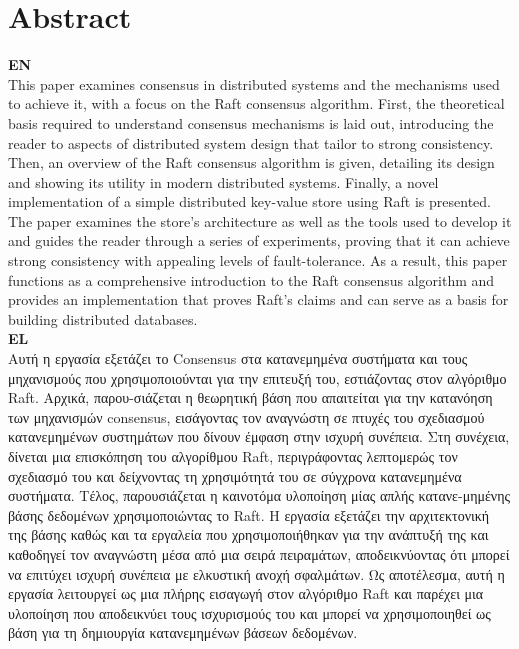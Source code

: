 \setlength{\parskip}{0pt}

\clearpage
\chapter*{Abstract}

\textbf{EN}\\

This paper examines consensus in distributed systems and the mechanisms used to achieve it, with a focus on the Raft consensus algorithm. First, the theoretical basis required to understand consensus mechanisms is laid out, introducing the reader to aspects of distributed system design that tailor to strong consistency. Then, an overview of the Raft consensus algorithm is given, detailing its design and showing its utility in modern distributed systems. Finally, a novel implementation of a simple distributed key-value store using Raft is presented. The paper examines the store's architecture as well as the tools used to develop it and guides the reader through a series of experiments, proving that it can achieve strong consistency with appealing levels of fault-tolerance. As a result, this paper functions as a comprehensive introduction to the Raft consensus algorithm and provides an implementation that proves Raft's claims and can serve as a basis for building distributed databases.\\

\textbf{EL}\\

Αυτή η εργασία εξετάζει το Consensus στα κατανεμημένα συστήματα και τους μηχανισμούς που χρησιμοποιούνται για την επιτευξή του, εστιάζοντας στον αλγόριθμο Raft. Αρχικά, παρου-σιάζεται η θεωρητική βάση που απαιτείται για την κατανόηση των μηχανισμών consensus, εισάγοντας τον αναγνώστη σε πτυχές του σχεδιασμού κατανεμημένων συστημάτων που δίνουν έμφαση στην ισχυρή συνέπεια. Στη συνέχεια, δίνεται μια επισκόπηση του αλγορίθμου Raft, περιγράφοντας λεπτομερώς τον σχεδιασμό του και δείχνοντας τη χρησιμότητά του σε σύγχρονα κατανεμημένα συστήματα. Τέλος, παρουσιάζεται η καινοτόμα υλοποίηση μίας απλής κατανε-μημένης βάσης δεδομένων χρησιμοποιώντας το Raft. Η εργασία εξετάζει την αρχιτεκτονική της βάσης καθώς και τα εργαλεία που χρησιμοποιήθηκαν για την ανάπτυξή της και καθοδηγεί τον αναγνώστη μέσα από μια σειρά πειραμάτων, αποδεικνύοντας ότι μπορεί να επιτύχει ισχυρή συνέπεια με ελκυστική ανοχή σφαλμάτων. Ως αποτέλεσμα, αυτή η εργασία λειτουργεί ως μια πλήρης εισαγωγή στον αλγόριθμο Raft και παρέχει μια υλοποίηση που αποδεικνύει τους ισχυρισμούς του και μπορεί να χρησιμοποιηθεί ως βάση για τη δημιουργία κατανεμημένων βάσεων δεδομένων.